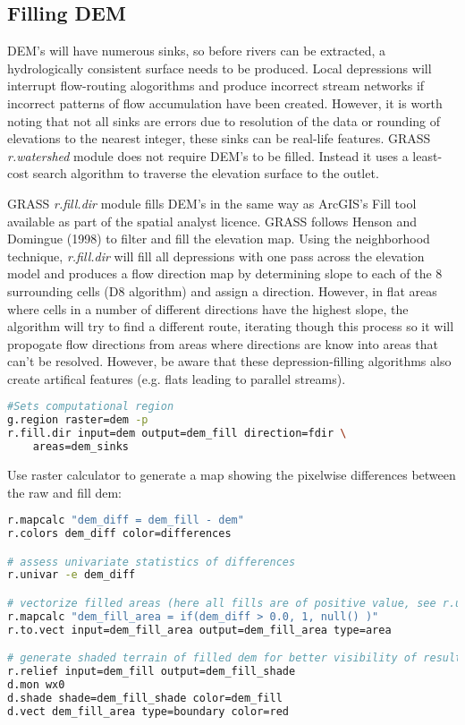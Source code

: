 \subsection{Filling DEM}

DEM's will have numerous sinks, so before rivers can be extracted, a hydrologically consistent surface needs to be produced. Local depressions will interrupt flow-routing alogorithms and produce incorrect stream networks if incorrect patterns of flow accumulation have been created. However, it is worth noting that not all sinks are errors due to resolution of the data or rounding of elevations to the nearest integer, these sinks can be real-life features. GRASS \emph{r.watershed} module does not require DEM's to be filled. Instead it uses a least-cost search algorithm to traverse the elevation surface to the outlet.

\noindent GRASS \emph{r.fill.dir} module fills DEM's in the same way as ArcGIS's Fill tool available as part of the spatial analyst licence. GRASS follows Henson and Domingue (1998) to filter and fill the elevation map. Using the neighborhood technique, \emph{r.fill.dir} will fill all depressions with one pass across the elevation model and produces a flow direction map by determining slope to each of the 8 surrounding cells (D8 algorithm) and assign a direction. However, in flat areas where cells in a number of different directions have the highest slope, the algorithm will try to find a different route, iterating though this process so it will propogate flow directions from areas where directions are know into areas that can't be resolved. However, be aware that these depression-filling algorithms also create artifical features (e.g. flats leading to parallel streams). 

\begin{lstlisting}[language=bash]
#Sets computational region
g.region raster=dem -p
r.fill.dir input=dem output=dem_fill direction=fdir \
	areas=dem_sinks
\end{lstlisting}

\noindent Use raster calculator to generate a map showing the pixelwise differences between the raw and fill dem:

\begin{lstlisting}[language=bash]
r.mapcalc "dem_diff = dem_fill - dem"
r.colors dem_diff color=differences

# assess univariate statistics of differences
r.univar -e dem_diff

# vectorize filled areas (here all fills are of positive value, see r.univar output)
r.mapcalc "dem_fill_area = if(dem_diff > 0.0, 1, null() )"
r.to.vect input=dem_fill_area output=dem_fill_area type=area

# generate shaded terrain of filled dem for better visibility of results and visualise differences
r.relief input=dem_fill output=dem_fill_shade
d.mon wx0
d.shade shade=dem_fill_shade color=dem_fill
d.vect dem_fill_area type=boundary color=red
\end{lstlisting}

